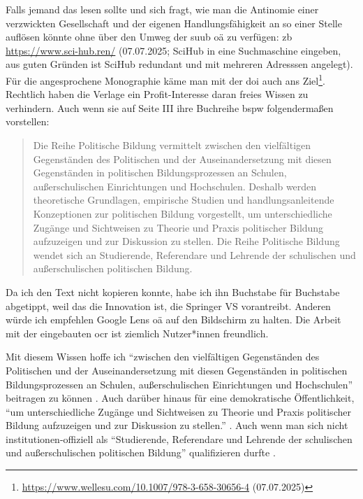 Falls jemand das lesen sollte und sich fragt, wie man die Antinomie einer verzwickten Gesellschaft und der eigenen Handlungsfähigkeit an so einer Stelle auflösen könnte ohne über den Umweg der \gls{suub} \gls{oä} zu verfügen: \gls{zb} \url{https://www.sci-hub.ren/} (07.07.2025; SciHub in eine Suchmaschine eingeben, aus guten Gründen ist SciHub redundant und mit mehreren Adresssen angelegt). 
Für die angesprochene Monographie käme man mit der \gls{doi} auch ans Ziel\footnote{
    \url{https://www.wellesu.com/10.1007/978-3-658-30656-4} (07.07.2025)
}. Rechtlich haben die Verlage ein Profit-Interesse daran freies Wissen zu verhindern. Auch wenn sie auf Seite III ihre Buchreihe \gls{bspw} folgendermaßen vorstellen: 
\begin{quote}
    Die Reihe Politische Bildung vermittelt zwischen den vielfältigen Gegenständen des Politischen und der Auseinandersetzung mit diesen Gegenständen in politischen Bildungsprozessen an Schulen, außerschulischen Einrichtungen und Hochschulen. Deshalb werden theoretische Grundlagen, empirische Studien und handlungsanleitende Konzeptionen zur politischen Bildung vorgestellt, um unterschiedliche Zugänge und Sichtweisen zu Theorie und Praxis politischer Bildung aufzuzeigen und zur Diskussion zu stellen. Die Reihe Politische Bildung wendet sich an Studierende, Referendare und Lehrende der schulischen und außerschulischen politischen Bildung.

    \autocite[III]{Schroder.2020}
\end{quote}
Da ich den Text nicht kopieren konnte, habe ich ihn Buchstabe für Buchstabe abgetippt, weil das die Innovation ist, die Springer VS vorantreibt. Anderen würde ich empfehlen Google Lens \gls{oä} auf den Bildschirm zu halten. Die Arbeit mit der eingebauten \gls{ocr} ist ziemlich Nutzer*innen freundlich. %

Mit diesem Wissen hoffe ich \enquote{zwischen den vielfältigen Gegenständen des Politischen und der Auseinandersetzung mit diesen Gegenständen in politischen Bildungsprozessen an Schulen, außerschulischen Einrichtungen und Hochschulen} beitragen zu können \autocite[III]{Schroder.2020}. Auch darüber hinaus für eine demokratische Öffentlichkeit, \enquote{um unterschiedliche Zugänge und Sichtweisen zu Theorie und Praxis politischer Bildung aufzuzeigen und zur Diskussion zu stellen.} \autocite[III]{Schroder.2020}. Auch wenn man sich nicht institutionen-offiziell als \enquote{Studierende, Referendare und Lehrende der schulischen und außerschulischen politischen Bildung} qualifizieren durfte \autocite[III]{Schroder.2020}. 


